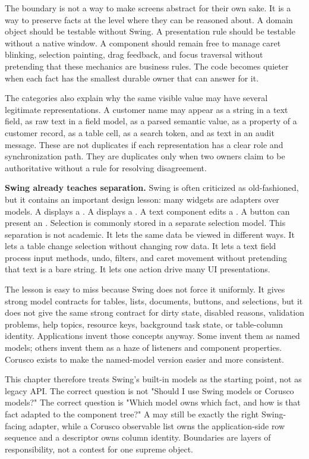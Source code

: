 The boundary is not a way to make screens abstract for their own sake. It is a way to preserve facts at the level where they can be reasoned about. A domain object should be testable without Swing. A presentation rule should be testable without a native window. A component should remain free to manage caret blinking, selection painting, drag feedback, and focus traversal without pretending that these mechanics are business rules. The code becomes quieter when each fact has the smallest durable owner that can answer for it.

The categories also explain why the same visible value may have several legitimate representations. A customer name may appear as a string in a text field, as raw text in a field model, as a parsed semantic value, as a property of a customer record, as a table cell, as a search token, and as text in an audit message. These are not duplicates if each representation has a clear role and synchronization path. They are duplicates only when two owners claim to be authoritative without a rule for resolving disagreement.

\textbf{Swing already teaches separation.} Swing is often criticized as old-fashioned, but it contains an important design lesson: many widgets are adapters over models. A  displays a . A  displays a . A text component edits a . A button can present an . Selection is commonly stored in a separate selection model. This separation is not academic. It lets the same data be viewed in different ways. It lets a table change selection without changing row data. It lets a text field process input methods, undo, filters, and caret movement without pretending that text is a bare string. It lets one action drive many UI presentations.

The lesson is easy to miss because Swing does not force it uniformly. It gives strong model contracts for tables, lists, documents, buttons, and selections, but it does not give the same strong contract for dirty state, disabled reasons, validation problems, help topics, resource keys, background task state, or table-column identity. Applications invent those concepts anyway. Some invent them as named models; others invent them as a haze of listeners and component properties. Corusco exists to make the named-model version easier and more consistent.

This chapter therefore treats Swing's built-in models as the starting point, not as legacy API. The correct question is not "Should I use Swing models or Corusco models?" The correct question is "Which model owns which fact, and how is that fact adapted to the component tree?" A  may still be exactly the right Swing-facing adapter, while a Corusco observable list owns the application-side row sequence and a descriptor owns column identity. Boundaries are layers of responsibility, not a contest for one supreme object.

